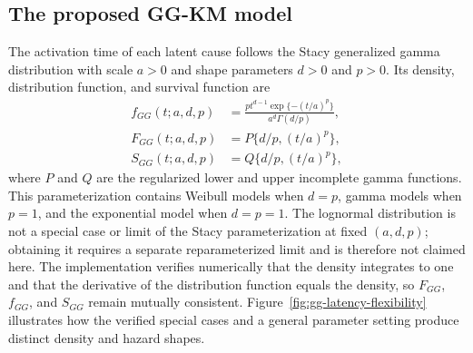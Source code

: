\subsection{The proposed GG-KM model}\label{sec:model-specification}


The activation time of each latent cause follows the Stacy generalized gamma distribution with scale $a>0$ and shape parameters $d>0$ and $p>0$.\cite{stacy1962} Its density, distribution function, and survival function are
\begin{equation}
	\begin{aligned}
		f_{GG}\left(t;a,d,p\right)
		&=\frac{p t^{d-1}\exp\{-(t/a)^p\}}
		{a^d\Gamma(d/p)},\\
		F_{GG}\left(t;a,d,p\right)
		&=P\{d/p,(t/a)^p\},\\
		S_{GG}\left(t;a,d,p\right)
		&=Q\{d/p,(t/a)^p\},
	\end{aligned}
	\label{eq:gg-distribution}
\end{equation}
where $P$ and $Q$ are the regularized lower and upper incomplete gamma
functions. This parameterization contains Weibull models when $d=p$,
gamma models when $p=1$, and the exponential model when $d=p=1$. The
lognormal distribution is not a special case or limit of the Stacy
parameterization at fixed $(a,d,p)$; obtaining it requires a separate
reparameterized limit and is therefore not claimed here. The
implementation verifies numerically that the density integrates to one
and that the derivative of the distribution function equals the density,
so $F_{GG}$, $f_{GG}$, and $S_{GG}$ remain mutually consistent. Figure~\ref{fig:gg-latency-flexibility} illustrates how the verified special cases and a general parameter setting produce distinct density and hazard shapes.

